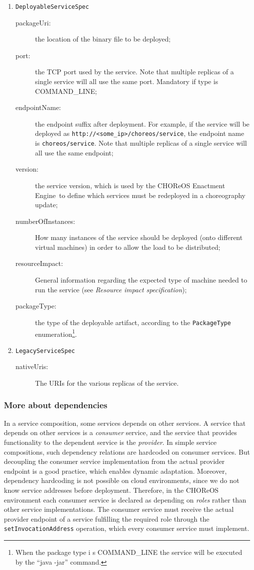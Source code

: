 \documentclass[a4paper, 10pt]{article}
\newcommand{\ee}{CHOReOS Enactment Engine}
\begin{document}
\begin{enumerate}
\item \verb!DeployableServiceSpec!
	\begin{description}
		\item [packageUri:] the location of the binary file to be deployed;
		\item [port:] the TCP port used by the service. Note that multiple replicas of a single service will all use the same port. Mandatory if type is COMMAND\_LINE;
		\item [endpointName:] the endpoint suffix after deployment. For example, if the service will be deployed as \verb!http://<some_ip>/choreos/service!, the endpoint name is \verb!choreos/service!. Note that multiple replicas of a single service will all use the same endpoint;
		\item [version:] the service version, which is used by the \ee\ to define which services must be redeployed in a choreography update;
		\item [numberOfInstances:] How many instances of the service should be deployed (onto different virtual machines) in order to allow the load to be distributed;
		\item [resourceImpact:] General information regarding the expected type of machine needed to run the service (see \emph{Resource impact specification});
		\item [packageType:] the type of the deployable artifact, according to the \verb!PackageType! enumeration\footnote{When the package type i    s COMMAND\_LINE the service will be executed by the ``java -jar'' command.}.
	\end{description}

\item \verb!LegacyServiceSpec!
	\begin{description}
		\item [nativeUris:] The URIs for the various replicas of the service.
	\end{description}

\end{enumerate}

\subsubsection*{More about dependencies}

In a service composition, some services depends on other services. A service that depends on other services is a \emph{consumer} service, and the service that provides functionality to the dependent service is the \emph{provider}. In simple service compositions, such dependency relations are hardcoded on consumer services. But decoupling the consumer service implementation from the actual provider endpoint is a good practice, which enables dynamic adaptation. Moreover, dependency hardcoding is not possible on cloud environments, since we do not know service addresses before deployment. Therefore, in the CHOReOS environment each consumer service is declared as depending on \emph{roles} rather than other service implementations. The consumer service must receive the actual provider endpoint of a service fulfilling the required role through the \verb!setInvocationAddress! operation, which every consumer service must implement.  
\end{document}
